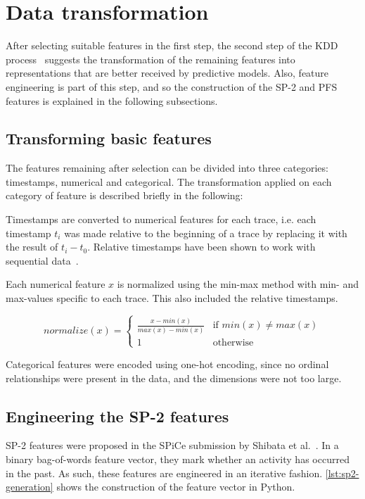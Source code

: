 \section{Data transformation}
\label{sec:eval:data-transformation}
After selecting suitable features in the first step, the second step of the KDD process~\cite{fayyad1996data} suggests the transformation of the remaining features into representations that are better received by predictive models. Also, feature engineering is part of this step, and so the construction of the SP-2 and PFS features is explained in the following subsections.

\subsection*{Transforming basic features}
The features remaining after selection can be divided into three categories: timestamps, numerical and categorical. The transformation applied on each category of feature is described briefly in the following:

Timestamps are converted to numerical features for each trace, i.e. each timestamp $t_i$ was made relative to the beginning of a trace by replacing it with the result of $t_i - t_0$. Relative timestamps have been shown to work with sequential data~\cite{lessmannBADS}.

Each numerical feature $x$ is normalized using the min-max method with min- and max-values specific to each trace. This also included the relative timestamps.

$$normalize(x) =
\begin{cases}
\frac{x-min(x)}{max(x)-min(x)} & \text{if } min(x) \neq max(x)\\
1 & \text{otherwise}
\end{cases}
$$

Categorical features were encoded using one-hot encoding, since no ordinal relationships were present in the data, and the dimensions were not too large.

\subsection*{Engineering the SP-2 features}
SP-2 features were proposed in the SPiCe submission by Shibata et al.~\cite{shibata2016bipartite}. In a binary bag-of-words feature vector, they mark whether an activity has occurred in the past. As such, these features are engineered in an iterative fashion. \autoref{lst:sp2-generation} shows the construction of the feature vector in Python.

